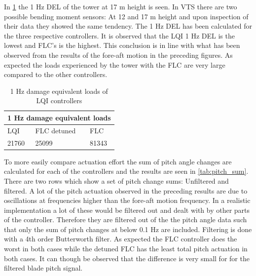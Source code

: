 \newpage

In \cref{tab:del} the 1 Hz DEL of the tower at 17 m height is seen. In VTS there are two possible bending moment sensors: At 12 and 17 m height and upon inspection of their data they showed the same tendency. The 1 Hz DEL has been calculated for the three respective controllers. It is observed that the LQI 1 Hz DEL is the lowest and FLC's is the highest. This conclusion is in line with what has been observed from the results of the fore-aft motion in the preceding figures. As expected the loads experienced by the tower with the FLC are very large compared to the other controllers.

\begin{table}[t]
	\centering
	\caption{1 Hz damage equivalent loads of LQI controllers}
	\label{tab:del}
	\begin{tabular}{@{}|lll|@{}}
		\toprule
		\multicolumn{3}{|c|}{1 Hz damage equivalent loads}                                                                     \\ \midrule
		\multicolumn{1}{|l|}{LQI}                           & \multicolumn{1}{l|}{FLC detuned} & FLC                           \\ \midrule
		\multicolumn{1}{|l|}{\cellcolor[HTML]{9AFF99}21760} & \multicolumn{1}{l|}{25099}       & \cellcolor[HTML]{FFCCC9}81343 \\ \bottomrule
	\end{tabular}
\end{table}

To more easily compare actuation effort the sum of pitch angle changes are calculated for each of the controllers and the results are seen in \cref{tab:pitch_sum}. There are two rows which show a set of pitch change sums: Unfiltered and filtered. A lot of the pitch actuation observed in the preceding results are due to oscillations at frequencies higher than the fore-aft motion frequency. In a realistic implementation a lot of these would be filtered out and dealt with by other parts of the controller. Therefore they are filtered out of the the pitch angle data such that only the sum of pitch changes at below 0.1 Hz are included. Filtering is done with a 4th order Butterworth filter. As expected the FLC controller does the worst in both cases while the detuned FLC has the least total pitch actuation in both cases. It can though be observed that the difference is very small for for the filtered blade pitch signal.


